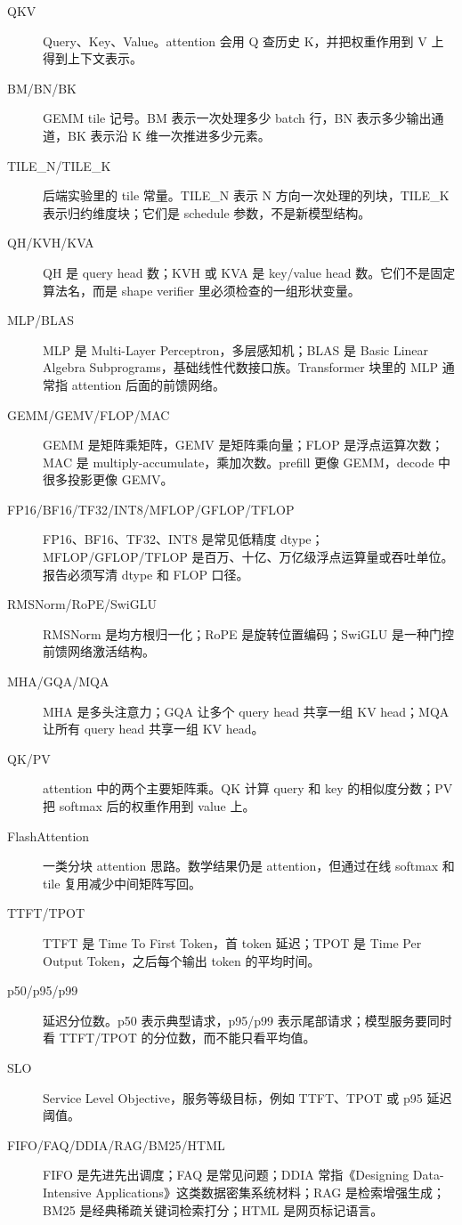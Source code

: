 \begin{description}
  \item[QKV] Query、Key、Value。attention 会用 Q 查历史 K，并把权重作用到 V 上得到上下文表示。
  \item[BM/BN/BK] GEMM tile 记号。BM 表示一次处理多少 batch 行，BN 表示多少输出通道，BK 表示沿 K 维一次推进多少元素。
  \item[TILE\_N/TILE\_K] 后端实验里的 tile 常量。TILE\_N 表示 N 方向一次处理的列块，TILE\_K 表示归约维度块；它们是 schedule 参数，不是新模型结构。
  \item[QH/KVH/KVA] QH 是 query head 数；KVH 或 KVA 是 key/value head 数。它们不是固定算法名，而是 shape verifier 里必须检查的一组形状变量。
  \item[MLP/BLAS] MLP 是 Multi-Layer Perceptron，多层感知机；BLAS 是 Basic Linear Algebra Subprograms，基础线性代数接口族。Transformer 块里的 MLP 通常指 attention 后面的前馈网络。
  \item[GEMM/GEMV/FLOP/MAC] GEMM 是矩阵乘矩阵，GEMV 是矩阵乘向量；FLOP 是浮点运算次数；MAC 是 multiply-accumulate，乘加次数。prefill 更像 GEMM，decode 中很多投影更像 GEMV。
  \item[FP16/BF16/TF32/INT8/MFLOP/GFLOP/TFLOP] FP16、BF16、TF32、INT8 是常见低精度 dtype；MFLOP/GFLOP/TFLOP 是百万、十亿、万亿级浮点运算量或吞吐单位。报告必须写清 dtype 和 FLOP 口径。
  \item[RMSNorm/RoPE/SwiGLU] RMSNorm 是均方根归一化；RoPE 是旋转位置编码；SwiGLU 是一种门控前馈网络激活结构。
  \item[MHA/GQA/MQA] MHA 是多头注意力；GQA 让多个 query head 共享一组 KV head；MQA 让所有 query head 共享一组 KV head。
  \item[QK/PV] attention 中的两个主要矩阵乘。QK 计算 query 和 key 的相似度分数；PV 把 softmax 后的权重作用到 value 上。
  \item[FlashAttention] 一类分块 attention 思路。数学结果仍是 attention，但通过在线 softmax 和 tile 复用减少中间矩阵写回。
  \item[TTFT/TPOT] TTFT 是 Time To First Token，首 token 延迟；TPOT 是 Time Per Output Token，之后每个输出 token 的平均时间。
  \item[p50/p95/p99] 延迟分位数。p50 表示典型请求，p95/p99 表示尾部请求；模型服务要同时看 TTFT/TPOT 的分位数，而不能只看平均值。
  \item[SLO] Service Level Objective，服务等级目标，例如 TTFT、TPOT 或 p95 延迟阈值。
  \item[FIFO/FAQ/DDIA/RAG/BM25/HTML] FIFO 是先进先出调度；FAQ 是常见问题；DDIA 常指《Designing Data-Intensive Applications》这类数据密集系统材料；RAG 是检索增强生成；BM25 是经典稀疏关键词检索打分；HTML 是网页标记语言。

\end{description}
